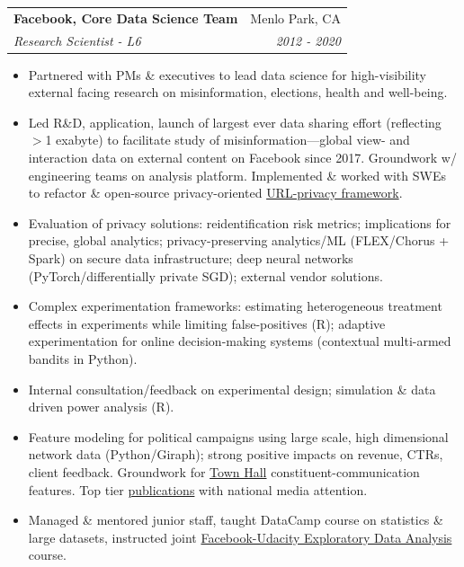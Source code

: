 \documentclass[letterpaper,11pt]{article}
\makeatletter
\newcommand{\resitem}[1]{\item #1 \vspace{-6pt}}
\newcommand{\ressubheading}[4]{\vspace{2pt}
\begin{tabular*}{7.58in}{l@{\extracolsep{\fill}}r}
		\textbf{#1} & #2 \\
		\textit{#3} & \textit{#4} \\
\end{tabular*}\vspace{-1pt}}
\makeatother
\begin{document}
\ressubheading{Facebook, Core Data Science Team}{Menlo Park, CA}{Research Scientist - L6}{2012 - 2020}
	\begin{itemize}
       	 	\resitem{Partnered with PMs \& executives to lead data science for high-visibility external facing research on misinformation, elections, health and well-being.} 
		\resitem{Led R\&D, application, launch of largest ever data sharing effort (reflecting $>$1 exabyte) to facilitate study of misinformation---global view- and interaction data on external content on Facebook since 2017. Groundwork w/ engineering teams on analysis platform. Implemented \& worked with SWEs to refactor \& open-source privacy-oriented \href{https://github.com/facebookresearch/URL-Sanitization}{URL-privacy framework}.}
		\resitem{Evaluation of privacy solutions: reidentification risk metrics; implications for precise, global analytics; privacy-preserving analytics/ML (FLEX/Chorus + Spark) on secure data infrastructure; deep neural networks (PyTorch/differentially private SGD); external vendor solutions.}
		\resitem{Complex experimentation frameworks: estimating heterogeneous treatment effects in experiments while limiting false-positives (R); adaptive experimentation for online decision-making systems (contextual multi-armed bandits in Python).}
		\resitem{Internal consultation/feedback on experimental design; simulation \& data driven power analysis (R).}
		\resitem{Feature modeling for political campaigns using large scale, high dimensional network data (Python/Giraph); strong positive impacts on revenue, CTRs, client feedback. Groundwork for \href{https://www.facebook.com/townhall/}{Town Hall} constituent-communication features. Top tier \href{https://dl.dropboxusercontent.com/u/25710348/Science-2015-Bakshy-1130-2.pdf}{publications} with national media attention. }
		\resitem{Managed \& mentored junior staff, taught DataCamp course on statistics \& large datasets, instructed joint \href{https://www.udacity.com/course/data-analysis-with-r--ud651}{Facebook-Udacity Exploratory Data Analysis} course.}
	\end{itemize}
\end{document}

